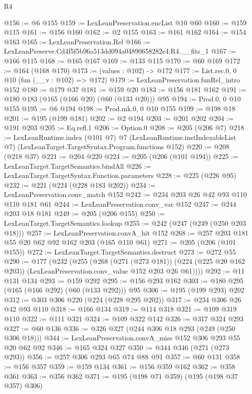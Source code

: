 \begin{lexlean}{R4}
\begin{coremodule}
@156 := @6 @155
@159 := LexLeanPreservation.encList @10 @60
@160 := @159 @115
@161 := @156 @160
@162 := @2 @155
@163 := @161 @162
@164 := @154 @163
@165 := LexLeanPreservation.Rel
@166 := LexLeanPreserve.Cd4f5f5b96a513dd094a04890658282c4.R4.__fits_1
@167 := @166 @115
@168 := @165 @167
@169 := @133 @115
@170 := @60 @169
@172 := @164 (@168 @170)
@173 := (values : @102) -> @172
@177 := List.rec.{0, 0} @10 (fun (__v : @102) => @172)
@179 := LexLeanPreservation.funRel_intro @152
@180 := @179 @37
@181 := @159 @20
@183 := @156 @181 @162
@191 := @180 @183 (@165 (@166 @20) (@60 (@133 @20))) @95
@194 := Prod.{0, 0} @10 @155
@195 := @6 @194
@198 := Prod.mk.{0, 0} @10 @155
@199 := @198 @18
@201 := @195 (@199 @181)
@202 := @2 @194
@203 := @201 @202
@204 := @191 @203
@205 := Eq.refl.{1}
@206 := Option.{0}
@208 := @205 (@206 @7)
@218 := LexLeanRuntime.index
    (@101 @7)
    @7
    (LexLeanRuntime.instIndexableList @7)
    (LexLeanTarget.TargetSyntax.Program.functions @152)
@220 := @208 (@218 @37)
@221 := @204 @220
@224 := @205 (@206 (@101 @194))
@225 := LexLeanTarget.TargetSemantics.bindAll
@226 := LexLeanTarget.TargetSyntax.Function.parameters
@228 := @225 (@226 @95)
@232 := @221 (@224 (@228 @183 @202))
@234 := LexLeanPreservation.conv_match @152
@242 := @234 @203 @26 @42 @93 @110 @110 @181 @61
@244 := LexLeanPreservation.conv_var @152
@247 := @244 @203 @18 @181
@249 := @205 (@206 @155)
@250 := LexLeanTarget.TargetSemantics.lookup
@255 := @242 (@247 (@249 (@250 @203 @18)))
@257 := LexLeanPreservation.convA_hit @152
@268 := @257 @203 @181 @55 @20 @62 @92 @162 @203 (@165 @110 @61)
@271 := @205 (@206 (@101 @155))
@272 := LexLeanTarget.TargetSemantics.destruct
@273 := @272 @55
@290 := @177
    (@232
      (@255
        (@268
          (@271 (@273 @181))
          (@224 (@225 @20 @162 @203))
          (LexLeanPreservation.conv_value @152 @203 @26 @61))))
@292 := @11 @131 @134
@293 := @159 @292
@295 := @156 @293 @162
@303 := @180 @295 (@165 (@166 @292) (@60 (@133 @292))) @95
@306 := @195 (@199 @293) @202
@312 := @303 @306 @220 (@224 (@228 @295 @202))
@317 := @234 @306 @26 @42 @93 @110
@318 := @166 @134
@319 := @114 @318
@321 := @109 @319 @110
@322 := @111 @321
@324 := @109 @322 @142
@326 := @317 @324 @293
@327 := @60 @136
@336 := @326 @327 (@244 @306 @18 @293 (@249 (@250 @306 @18)))
@344 := LexLeanPreservation.convA_miss @152 @306 @293 @55 @20 @62 @92
@346 := @165 @324 @327
@350 := @344 @346 (@271 (@273 @293))
@356 := @257 @306 @293 @65 @74 @88 @91
@357 := @60 @131
@358 := @156 @357
@359 := @159 @134
@361 := @156 @359 @162
@362 := @358 @361
@363 := @356 @362
@371 := @195 (@198 @71 @359) (@195 (@198 @37 @357) @306)

\end{coremodule}
\end{lexlean}
